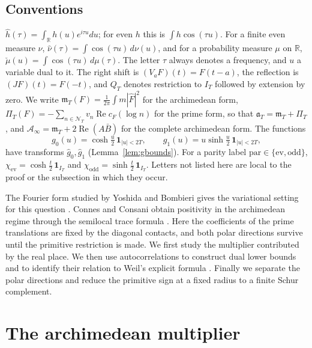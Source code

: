 \documentclass[11pt]{amsart}
\theoremstyle{definition}
\theoremstyle{remark}
\newcommand{\R}{\mathbb R}
\newcommand{\Rel}{\operatorname{Re}}
\newcommand{\IT}{I_T}
\newcommand{\gh}[1]{\widehat g_{#1}}
\newcommand{\nuh}{\widehat\nu}
\newcommand{\Fh}{\widehat F}
\newcommand{\cF}{c_F}
\newcommand{\NT}{\mathcal N_T}
\newcommand{\Ainf}{\mathcal A_\infty}
\newcommand{\PiT}{\Pi_T}
\newcommand{\mT}{\mathfrak m_T}
\begin{document}
\subsection{Conventions}\label{subsec:conv}
$\widehat h(\tau)=\int_\R h(u)e^{i\tau u}du$; for even $h$ this is $\int h\cos(\tau u)$. For a finite even
measure $\nu$, $\nuh(\tau)=\int\cos(\tau u)\,d\nu(u)$, and for a probability measure $\mu$ on $\R$,
$\check\mu(u)=\int\cos(\tau u)\,d\mu(\tau)$. The letter $\tau$ always denotes a frequency, and $u$ a
variable dual to it. The right shift is $(V_aF)(t)=F(t-a)$, the reflection is $(JF)(t)=F(-t)$, and $Q_T$
denotes restriction to $\IT$ followed by extension by zero. We write $\mT(F)=\frac1{2\pi}\int m|\Fh|^2$
for the archimedean form, $\PiT(F)=-\sum_{n\in\NT}v_n\Rel\cF(\log n)$ for the prime form, so that
$\mathfrak a_T=\mT+\PiT$, and $\Ainf=\mT+2\Rel(A\bar B)$ for the complete archimedean form. The functions
\begin{equation}\label{eq:g}
g_0(u)=\cosh\tfrac u2\,\mathbf 1_{|u|<2T},\qquad g_1(u)=u\sinh\tfrac u2\,\mathbf 1_{|u|<2T},
\end{equation}
have transforms $\gh0,\gh1$ (Lemma~\ref{lem:gbounds}). For a parity label
$\mathrm{par}\in\{\mathrm{ev},\mathrm{odd}\}$, $\chi_{\mathrm{ev}}=\cosh\frac t2\,\mathbf 1_{\IT}$ and
$\chi_{\mathrm{odd}}=\sinh\frac t2\,\mathbf 1_{\IT}$. Letters not listed here are local to the proof or
the subsection in which they occur.

The Fourier form studied by Yoshida and Bombieri gives the variational setting for this question
\cite{Yoshida1992,Bombieri2000}. Connes and Consani obtain positivity in the
archimedean regime through the semilocal trace formula \cite{ConnesConsani2021}.
Here the coefficients of the prime translations are fixed by the diagonal
contacts, and both polar directions survive until the primitive restriction is made.
We first study the multiplier contributed by the real place. We then use
autocorrelations to construct dual lower bounds and to identify their relation
to Weil's explicit formula \cite{Weil52}. Finally we separate the polar directions
and reduce the primitive sign at a fixed radius to a finite Schur complement.
\section{The archimedean multiplier}\label{sec:levy}
\end{document}
